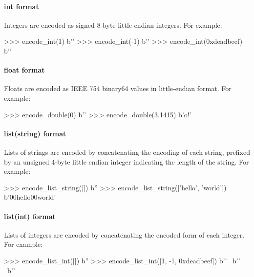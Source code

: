 \paragraph{int format}

Integers are encoded as signed 8-byte little-endian integers.  For example:

\begin{pythoncode}
>>> encode_int(1)
b''
>>> encode_int(-1)
b'\xff\xff\xff\xff\xff\xff\xff\xff'
>>> encode_int(0xdeadbeef)
b'\xef\xbe\xad\xde{}'
\end{pythoncode}

\paragraph{float format}

Floats are encoded as IEEE 754 binary64 values in little-endian format.  For
example:

\begin{pythoncode}
>>> encode_double(0)
b''
>>> encode_double(3.1415)
b'o\xca!\t@'
\end{pythoncode}

\paragraph{list(string) format}

Lists of strings are encoded by concatenating the encoding of each string,
prefixed by an unsigned 4-byte little endian integer indicating the length of
the string.  For example:

\begin{pythoncode}
>>> encode_list_string([])
b''
>>> encode_list_string(['hello', 'world'])
b'\x00hello\x00world'
\end{pythoncode}

\paragraph{list(int) format}

Lists of integers are encoded by concatenating the encoded form of each integer.
For example:

\begin{pythoncode}
>>> encode_list_int([])
b''
>>> encode_list_int([1, -1, 0xdeadbeef])
b'' \
b'\xff\xff\xff\xff\xff\xff\xff\xff' \
b'\xef\xbe\xad\xde{}'
\end{pythoncode}


